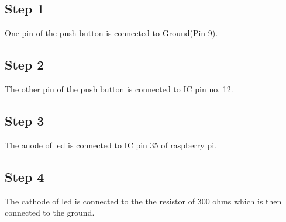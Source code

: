 \documentclass[a4paper,12pt,oneside]{book}
\begin{document}
\subsection*{Step 1}
One pin of the push button is connected to Ground(Pin 9).
\subsection*{Step 2}
The other pin of the push button is connected to IC pin no. 12.
\subsection*{Step 3}
The anode of led is connected to IC pin 35 of raspberry pi.
\subsection*{Step 4}
The cathode of led is connected to the the resistor of 300 ohms which
is then connected to the ground.
\end{document}
